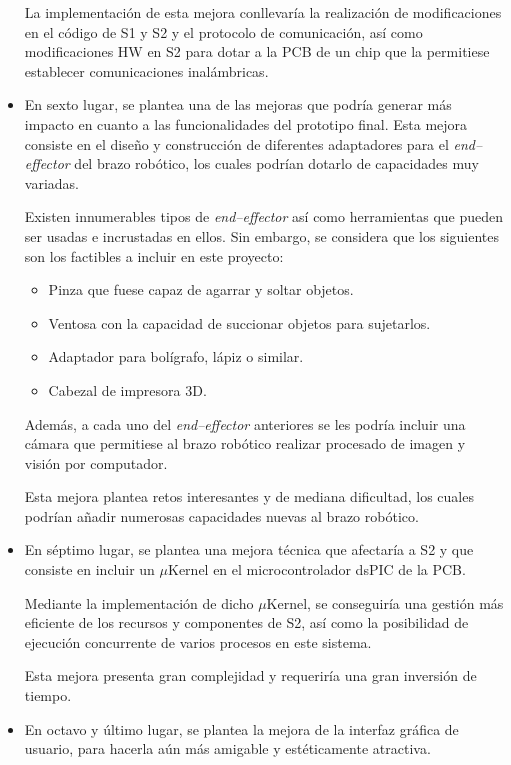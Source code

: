 \begin{itemize}
    La implementación de esta mejora conllevaría la realización de modificaciones en el código de \ac{S1} y \ac{S2} y el protocolo de comunicación, así como modificaciones \ac{HW} en \ac{S2} para dotar a la PCB de un chip que la permitiese establecer comunicaciones inalámbricas.
    
    \item En sexto lugar, se plantea una de las mejoras que podría generar más impacto en cuanto a las funcionalidades del prototipo final. Esta mejora consiste en el diseño y construcción de diferentes adaptadores para el \textit{end--effector} del brazo robótico, los cuales podrían dotarlo de capacidades muy variadas.
    
    Existen innumerables tipos de \textit{end--effector} así como herramientas que pueden ser usadas e incrustadas en ellos. Sin embargo, se considera que los siguientes son los factibles a incluir en este proyecto:
    \begin{itemize}
        \item Pinza que fuese capaz de agarrar y soltar objetos.
        \item Ventosa con la capacidad de succionar objetos para sujetarlos.
        \item Adaptador para bolígrafo, lápiz o similar.
        \item Cabezal de impresora 3D.
    \end{itemize}
    Además, a cada uno del \textit{end--effector} anteriores se les podría incluir una cámara que permitiese al brazo robótico realizar procesado de imagen y visión por computador.
    
    Esta mejora plantea retos interesantes y de mediana dificultad, los cuales podrían añadir numerosas capacidades nuevas al brazo robótico.
    
    \item En séptimo lugar, se plantea una mejora técnica que afectaría a \ac{S2} y que consiste en incluir un $\mu$Kernel en el microcontrolador dsPIC de la PCB.
    
    Mediante la implementación de dicho $\mu$Kernel, se conseguiría una gestión más eficiente de los recursos y componentes de \ac{S2}, así como la posibilidad de ejecución concurrente de varios procesos en este sistema.
    
    Esta mejora presenta gran complejidad y requeriría una gran inversión de tiempo.
    
    \item En octavo y último lugar, se plantea la mejora de la interfaz gráfica de usuario, para hacerla aún más amigable y estéticamente atractiva.
    

\end{itemize}
